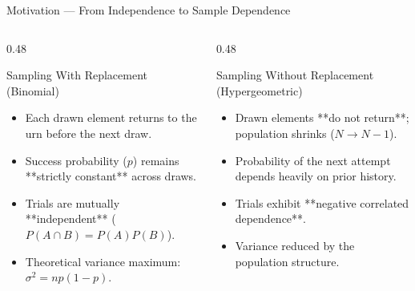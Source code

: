 \documentclass[aspectratio=169,xcolor={dvipsnames,table}]{beamer}
\begin{document}
\begin{frame}{Motivation --- From Independence to Sample Dependence}
	\vspace{-0.15cm}
	\begin{columns}[T]
		\begin{column}{0.48\textwidth}
			\begin{block}{Sampling With Replacement (Binomial)}
				\footnotesize
				\begin{itemize}
					\itemsep=0.05cm
					\item Each drawn element returns to the urn before the next draw.
					\item Success probability ($p$) remains **strictly constant** across draws.
					\item Trials are mutually **independent** ($P(A \cap B) = P(A)P(B)$).
					\item Theoretical variance maximum: $\sigma^2 = np(1-p)$.
				\end{itemize}
			\end{block}
		\end{column}
		\begin{column}{0.48\textwidth}
			\begin{alertblock}{Sampling Without Replacement (Hypergeometric)}
				\footnotesize
				\begin{itemize}
					\itemsep=0.05cm
					\item Drawn elements **do not return**; population shrinks ($N \to N-1$).
					\item Probability of the next attempt depends heavily on prior history.
					\item Trials exhibit **negative correlated dependence**.
					\item Variance reduced by the population structure.
				\end{itemize}
			\end{alertblock}
		\end{column}
	\end{columns}
\end{frame}
\end{document}
